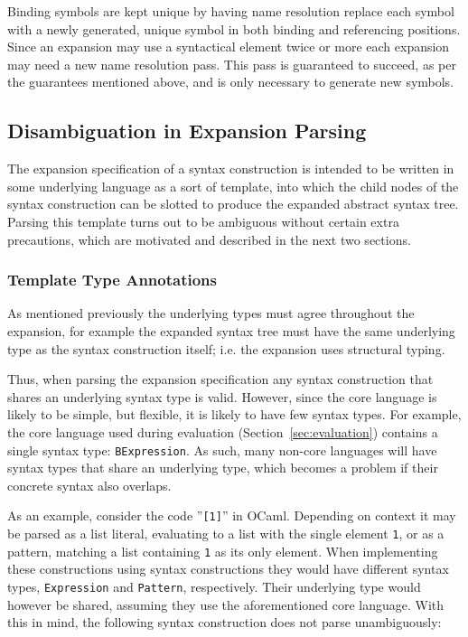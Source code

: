 \documentclass{kththesis}
\begin{document}
Binding symbols are kept unique by having name resolution replace each symbol with a newly generated, unique symbol in both binding and referencing positions. Since an expansion may use a syntactical element twice or more each expansion may need a new name resolution pass. This pass is guaranteed to succeed, as per the guarantees mentioned above, and is only necessary to generate new symbols.


\subsection{Disambiguation in Expansion Parsing} \label{sec:disambiguation-implementation}

The expansion specification of a syntax construction is intended to be written in some underlying language as a sort of template, into which the child nodes of the syntax construction can be slotted to produce the expanded abstract syntax tree. Parsing this template turns out to be ambiguous without certain extra precautions, which are motivated and described in the next two sections.

\subsubsection{Template Type Annotations}

As mentioned previously the underlying types must agree throughout the expansion, for example the expanded syntax tree must have the same underlying type as the syntax construction itself; i.e. the expansion uses structural typing.

Thus, when parsing the expansion specification any syntax construction that shares an underlying syntax type is valid. However, since the core language is likely to be simple, but flexible, it is likely to have few syntax types. For example, the core language used during evaluation (Section~\ref{sec:evaluation}) contains a single syntax type: \texttt{BExpression}. As such, many non-core languages will have syntax types that share an underlying type, which becomes a problem if their concrete syntax also overlaps.

As an example, consider the code ''\texttt{[1]}'' in OCaml. Depending on context it may be parsed as a list literal, evaluating to a list with the single element \texttt{1}, or as a pattern, matching a list containing \texttt{1} as its only element. When implementing these constructions using syntax constructions they would have different syntax types, \texttt{Expression} and \texttt{Pattern}, respectively. Their underlying type would however be shared, assuming they use the aforementioned core language. With this in mind, the following syntax construction does not parse unambiguously:
\end{document}
